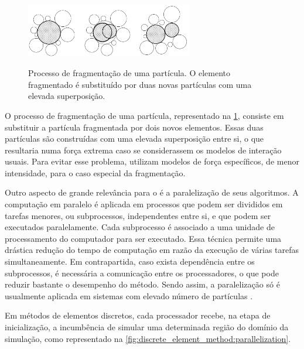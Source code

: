 \begin{figure}[h]
	\caption{Processo de fragmentação de uma partícula. O elemento fragmentado é substituído por duas novas partículas com uma elevada superposição.}
	\centering
		\includegraphics[width=0.65\textwidth]{images/discrete_element_method/fragmentation/particle_fragmentation_process}
	\label{fig:discrete_element_method:fragmentation}
\end{figure}

O processo de fragmentação de uma partícula, representado na \cref{fig:discrete_element_method:fragmentation}, consiste em substituir a partícula fragmentada por dois novos elementos. Essas duas partículas são construídas com uma elevada superposição entre si, o que resultaria numa força extrema caso se considerassem os modelos de interação usuais. Para evitar esse problema, utilizam modelos de força específicos, de menor intensidade, para o caso especial da fragmentação.

Outro aspecto de grande relevância para o \DEM{} é a paralelização de seus algoritmos. A computação em paralelo é aplicada em processos que podem ser divididos em tarefas menores, ou subprocessos, independentes entre si, e que podem ser executados paralelamente. Cada subprocesso é associado a uma unidade de processamento do computador para ser executado. Essa técnica permite uma drástica redução do tempo de computação em razão da execução de várias tarefas simultaneamente. Em contrapartida, caso exista dependência entre os subprocessos, é necessária a comunicação entre os processadores, o que pode reduzir bastante o desempenho do método. Sendo assim, a paralelização só é usualmente aplicada em sistemas com elevado número de partículas \cite[p. 128]{bib:computational_granular_dynamics}.

Em métodos de elementos discretos, cada processador recebe, na etapa de inicialização, a incumbência de simular uma determinada região do domínio da simulação, como representado na \cref{fig:discrete_element_method:parallelization}.

